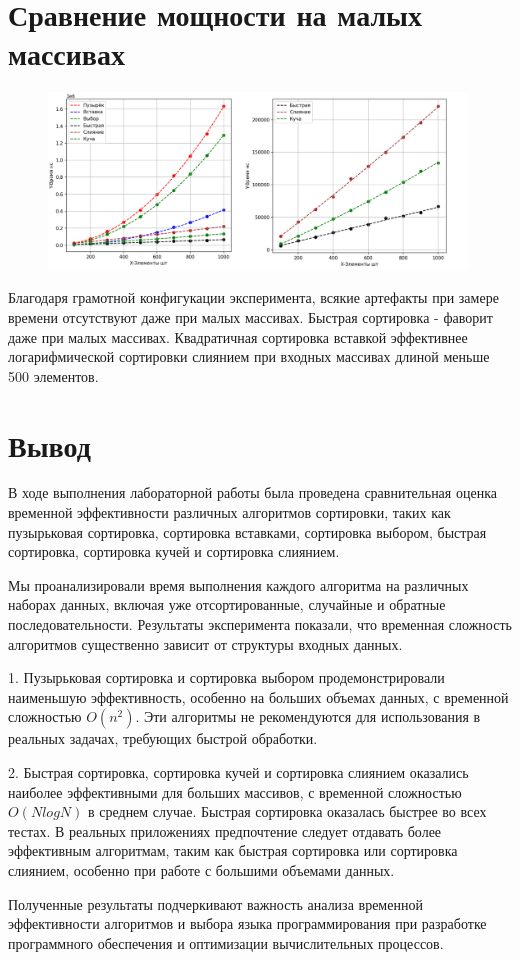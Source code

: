 \documentclass[a4paper,12pt]{article} %
\begin{document}
\section{Сравнение мощности на малых массивах}
\begin{figure}[H]
    \centering
    \includegraphics[width=0.99\textwidth]{p2.jpg}
\end{figure} 
Благодаря грамотной конфигукации эксперимента, всякие артефакты при замере времени отсутствуют даже при малых массивах. Быстрая сортировка - фаворит даже при малых массивах. Квадратичная сортировка вставкой эффективнее логарифмической сортировки слиянием при входных массивах длиной меньше 500 элементов.
\section{Вывод}
В ходе выполнения лабораторной работы была проведена сравнительная оценка временной эффективности различных алгоритмов сортировки, таких как пузырьковая сортировка, сортировка вставками, сортировка выбором, быстрая сортировка, сортировка кучей и сортировка слиянием. \par

Мы проанализировали время выполнения каждого алгоритма на различных наборах данных, включая уже отсортированные, случайные и обратные последовательности. Результаты эксперимента показали, что временная сложность алгоритмов существенно зависит от структуры входных данных.\par

1. Пузырьковая сортировка и сортировка выбором продемонстрировали наименьшую эффективность, особенно на больших объемах данных, с временной сложностью $O(n^2)$. Эти алгоритмы не рекомендуются для использования в реальных задачах, требующих быстрой обработки.\par

2. Быстрая сортировка, сортировка кучей и сортировка слиянием оказались наиболее эффективными для больших массивов, с временной сложностью $O(NlogN)$ в среднем случае. Быстрая сортировка оказалась быстрее во всех тестах.
В реальных приложениях предпочтение следует отдавать более эффективным алгоритмам, таким как быстрая сортировка или сортировка слиянием, особенно при работе с большими объемами данных.\par 

Полученные результаты подчеркивают важность анализа временной эффективности алгоритмов и выбора языка программирования при разработке программного обеспечения и оптимизации вычислительных процессов.
\end{document}
